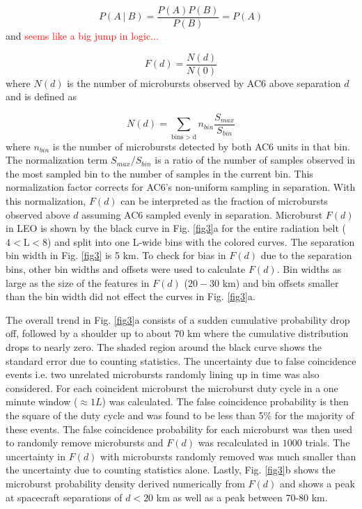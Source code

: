 \documentclass[draft]{agujournal2019}
\begin{document}
\begin{equation}
P(A \ \vert \ B) = \frac{P(A)P(B)}{P(B)} = P(A)
\end{equation} and \textcolor{red}{seems like a big jump in logic...}

\begin{equation}
F(d) = \frac{N(d)}{N(0)}
\end{equation} where $N(d)$ is the number of microbursts observed by AC6 above separation $d$ and is defined as

\begin{equation}
N(d) = \sum_{\mathrm{bins > d}} n_{bin} \frac{S_{max}}{S_{bin}}
\end{equation} where $n_{bin}$ is the number of microbursts detected by both AC6 units in that bin. The normalization term $S_{max}/S_{bin}$ is a ratio of the number of samples observed in the most sampled bin to the number of samples in the current bin. This normalization factor corrects for AC6's non-uniform sampling in separation. With this normalization, $F(d)$ can be interpreted as the fraction of microbursts observed above $d$ assuming AC6 sampled evenly in separation. Microburst $F(d)$ in LEO is shown by the black curve in Fig. \ref{fig3}a for the entire radiation belt ($4 < \mathrm{L}< 8$) and split into one L-wide bins with the colored curves. The separation bin width in Fig. \ref{fig3} is 5 km. To check for bias in $F(d)$ due to the separation bins, other bin widths and offsets were used to calculate $F(d)$. Bin widths as large as the size of the features in $F(d)$ ($20-30$ km) and bin offsets smaller than the bin width did not effect the curves in Fig. \ref{fig3}a.

The overall trend in Fig. \ref{fig3}a consists of a sudden cumulative probability drop off, followed by a shoulder up to about 70 km where the cumulative distribution drops to nearly zero. The shaded region around the black curve shows the standard error due to counting statistics. The uncertainty due to false coincidence events i.e. two unrelated microbursts randomly lining up in time was also considered. For each coincident microburst the microburst duty cycle in a one minute window ($\approx 1 L$) was calculated. The false coincidence probability is then the square of the duty cycle and was found to be less than 5\% for the majority of these events. The false coincidence probability for each microburst was then used to randomly remove microbursts and $F(d)$ was recalculated in $1000$ trials. The uncertainty in $F(d)$ with microbursts randomly removed was much smaller than the uncertainty due to counting statistics alone. Lastly, Fig. \ref{fig3}b shows the microburst probability density derived numerically from $F(d)$ and shows a peak at spacecraft separations of $d < 20 $ km as well as a peak between 70-80 km. 
\end{document}
